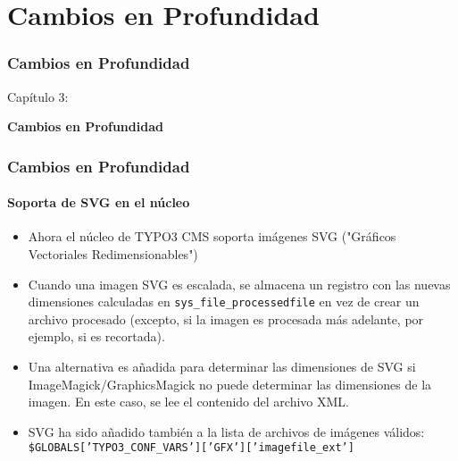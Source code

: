 %

\section{Cambios en Profundidad}
\begin{frame}[fragile]
	\frametitle{Cambios en Profundidad}

	\begin{center}\huge{Capítulo 3:}\end{center}
	\begin{center}\huge{\color{typo3darkgrey}\textbf{Cambios en Profundidad}}\end{center}

\end{frame}

\begin{frame}[fragile]
	\frametitle{Cambios en Profundidad}
	\framesubtitle{Soporta de SVG en el núcleo}

	\begin{itemize}
		\item Ahora el núcleo de TYPO3 CMS soporta imágenes SVG ("Gráficos Vectoriales Redimensionables")

		\item Cuando una imagen SVG es escalada, se almacena un registro con las nuevas
			dimensiones calculadas en \texttt{sys\_file\_processedfile} en vez de crear
			un archivo procesado\newline
			\small(excepto, si la imagen es procesada más adelante, por ejemplo, si es recortada)\normalsize.

		\item Una alternativa es añadida para determinar las dimensiones de SVG si
			ImageMagick/GraphicsMagick no puede determinar las dimensiones
			de la imagen. En este caso, se lee el contenido del archivo XML.

		\item SVG ha sido añadido también a la lista de archivos de imágenes válidos:\newline
			\texttt{\$GLOBALS['TYPO3\_CONF\_VARS']['GFX']['imagefile\_ext']}

	\end{itemize}

\end{frame}

